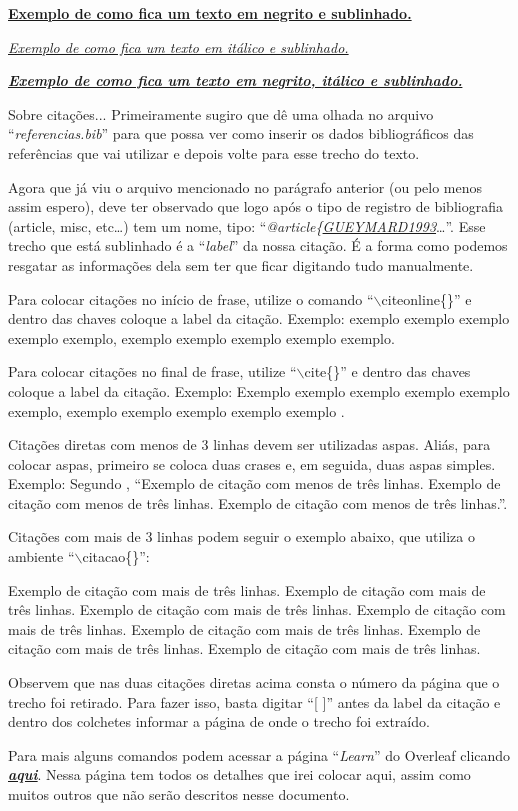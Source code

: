 \textbf{\underline{Exemplo de como fica um texto em negrito e sublinhado.}}

\textit{\underline{Exemplo de como fica um texto em itálico e sublinhado.}}

\textbf{\textit{\underline{Exemplo de como fica um texto em negrito, itálico e sublinhado.}}}

Sobre citações... Primeiramente sugiro que dê uma olhada no arquivo ``\textit{referencias.bib}'' para que possa ver como inserir os dados bibliográficos das referências que vai utilizar e depois volte para esse trecho do texto.

Agora que já viu o arquivo mencionado no parágrafo anterior (ou pelo menos assim espero), deve ter observado que logo após o tipo de registro de bibliografia (article, misc, etc\ldots) tem um nome, tipo: ``\textit{@article\{\underline{GUEYMARD1993}}\ldots''. Esse trecho que está sublinhado é a ``\textit{label}'' da nossa citação. É a forma como podemos resgatar as informações dela sem ter que ficar digitando tudo manualmente.

Para colocar citações no início de frase, utilize o comando ``$\backslash$citeonline\{\}'' e dentro das chaves coloque a label da citação. Exemplo:  exemplo exemplo exemplo exemplo exemplo, exemplo exemplo exemplo exemplo exemplo.

Para colocar citações no final de frase, utilize ``$\backslash$cite\{\}'' e dentro das chaves coloque a label da citação. Exemplo: Exemplo  exemplo exemplo exemplo exemplo exemplo, exemplo exemplo exemplo exemplo  exemplo \cite{HOVE2013}.

Citações diretas com menos de 3 linhas devem ser utilizadas aspas. Aliás, para colocar aspas, primeiro se coloca duas crases e, em seguida, duas aspas simples. Exemplo: Segundo , ``Exemplo de citação com menos de três linhas. Exemplo de citação com menos de três linhas. Exemplo de citação com menos de três linhas.''.

Citações com mais de 3 linhas podem seguir o exemplo abaixo, que utiliza o ambiente ``$\backslash$citacao\{\}'':

\begin{citacao}
Exemplo de citação com mais de três linhas. Exemplo de citação com mais de três linhas. Exemplo de citação com mais de três linhas. Exemplo de citação com mais de três linhas. Exemplo de citação com mais de três linhas. Exemplo de citação com mais de três linhas. Exemplo de citação com mais de três linhas. \cite[p.2]{HOVE2013}
\end{citacao}

Observem que nas duas citações diretas acima consta o número da página que o trecho foi retirado. Para fazer isso, basta digitar ``[ ]'' antes da label da citação e dentro dos colchetes informar a página de onde o trecho foi extraído.

Para mais alguns comandos podem acessar a página ``\textit{Learn}'' do Overleaf clicando \href{https://pt.overleaf.com/learn}{\underline{\textit{\textbf{aqui}}}}. Nessa página tem todos os detalhes que irei colocar aqui, assim como muitos outros que não serão descritos nesse documento.